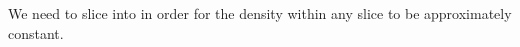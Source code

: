 \documentclass{article}
\begin{document}
\begin{enumerate}
\begin{enumerate}
    \begin{solution}
      We need to slice into  in order for the density within
      any slice to be approximately constant. 
    \end{solution}

  \end{enumerate}

\end{enumerate}

\end{document}
